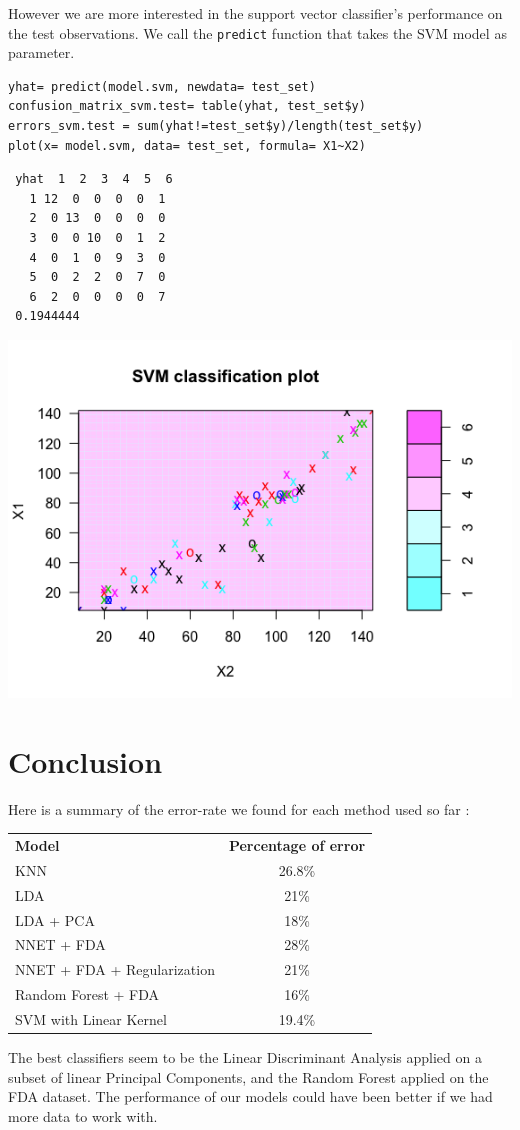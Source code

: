 \documentclass[]{report}
\begin{document}
However we are more interested in the support vector classifier’s performance on the test observations. We call the \texttt{predict} function that takes the SVM model as parameter.
\begin{lstlisting}
yhat= predict(model.svm, newdata= test_set)
confusion_matrix_svm.test= table(yhat, test_set$y)
errors_svm.test = sum(yhat!=test_set$y)/length(test_set$y)
plot(x= model.svm, data= test_set, formula= X1~X2)
\end{lstlisting}
\begin{verbatim}
 yhat  1  2  3  4  5  6
   1 12  0  0  0  0  1
   2  0 13  0  0  0  0
   3  0  0 10  0  1  2
   4  0  1  0  9  3  0
   5  0  2  2  0  7  0
   6  2  0  0  0  0  7
 0.1944444
\end{verbatim}

\begin{center}
	\includegraphics[width=0.8\linewidth]{Figures/svm_test_plot.png}
	\label{SVM on test set}
\end{center}

\pagebreak
\section{Conclusion}
Here is a summary of the error-rate we found for each method used so far : 
\begin{center}
\begin{tabular}{l c}
\textbf{Model} & \textbf{Percentage of error} \\
KNN & 26.8\% \\
LDA & 21\% \\
LDA + PCA & 18\% \\
NNET + FDA & 28\% \\
NNET + FDA + Regularization & 21\% \\
Random Forest + FDA & 16\% \\
SVM with Linear Kernel & 19.4\%
\end{tabular}
\end{center}

The best classifiers seem to be the Linear Discriminant Analysis applied on a subset of linear Principal Components, and the Random Forest applied on the FDA dataset. The performance of our models could have been better if we had more data to work with.
\end{document}
